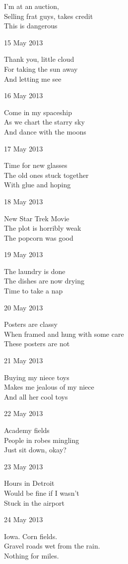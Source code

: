 \documentclass[12pt]{article}
\begin{document}
I'm at an auction, \\
Selling frat guys, takes credit \\
This is dangerous

15 May 2013

Thank you, little cloud \\
For taking the sun away \\
And letting me see

16 May 2013

Come in my spaceship \\
As we chart the starry sky \\
And dance with the moons

17 May 2013

Time for new glasses \\
The old ones stuck together \\
With glue and hoping

\newpage

18 May 2013

New Star Trek Movie \\
The plot is horribly weak \\
The popcorn was good

19 May 2013

The laundry is done \\
The dishes are now drying \\
Time to take a nap

20 May 2013

Posters are classy \\
When framed and hung with some care \\
These posters are not

21 May 2013

Buying my niece toys \\
Makes me jealous of my niece \\
And all her cool toys

22 May 2013

Academy fields \\
People in robes mingling \\
Just sit down, okay?

23 May 2013

Hours in Detroit \\
Would be fine if I wasn't \\
Stuck in the airport

24 May 2013

Iowa. Corn fields. \\
Gravel roads wet from the rain. \\
Nothing for miles.
\end{document}
